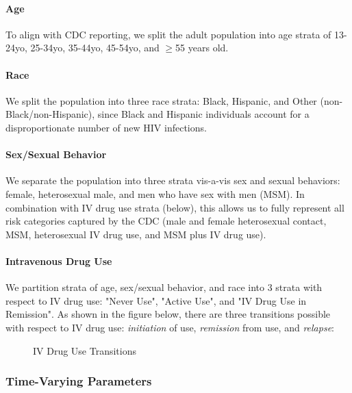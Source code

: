 \documentclass{article}
\begin{document}
\paragraph{Age} To align with CDC reporting, we split the adult population into age strata of 13-24yo, 25-34yo, 35-44yo, 45-54yo, and $\geq$55 years old.

\paragraph{Race} We split the population into three race strata: Black, Hispanic, and Other (non-Black/non-Hispanic), since Black and Hispanic individuals account for a disproportionate number of new HIV infections.

\paragraph{Sex/Sexual Behavior} We separate the population into three strata vis-a-vis sex and sexual behaviors: female, heterosexual male, and men who have sex with men (MSM). In combination with IV drug use strata (below), this allows us to fully represent all risk categories captured by the CDC (male and female heterosexual contact, MSM, heterosexual IV drug use, and MSM plus IV drug use).

\paragraph{Intravenous Drug Use}

We partition strata of age, sex/sexual behavior, and race into 3 strata with respect to IV drug use: "Never Use", "Active Use", and "IV Drug Use in Remission". As shown in the figure below, there are three transitions possible with respect to IV drug use: \textit{initiation} of use, \textit{remission} from use, and \textit{relapse}:

\begin{figure}[H]
	\caption{IV Drug Use Transitions}
	\centering
\end{figure}

\subsubsection{Time-Varying Parameters}
\end{document}
